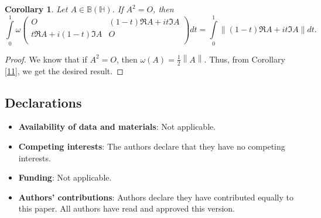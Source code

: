 \documentclass[12pt,twoside,reqno]{amsart}
\newtheorem{corollary}{Corollary}[section]
\numberwithin{equation}{section}
\begin{document}
\begin{corollary}
Let $A\in \mathbb B\left( \mathbb H \right)$. If ${{A}^{2}}=O$, then
\[\int\limits_{0}^{1}{\omega \left( \begin{matrix}
   O & \left( 1-t \right)\Re A+it\Im A  \\
   t\Re A+i\left( 1-t \right)\Im A & O  \\
\end{matrix} \right)dt}=\int\limits_{0}^{1}{\left\| \left( 1-t \right)\Re A+it\Im A \right\|dt}.\]
\end{corollary}
\begin{proof}
We know that if ${{A}^{2}}=O$, then $\omega \left( A \right)=\frac{1}{2}\left\| A \right\|$. Thus, from Corollary \ref{11}, we get the desired result.
\end{proof}







\subsection*{Declarations}

\begin{itemize}
\item \textbf{Availability of data and materials}: Not applicable.

\item \textbf{Competing interests}: The authors declare that they have no
competing interests.

\item \textbf{Funding}: Not applicable.

\item \textbf{Authors' contributions}: Authors declare they have contributed
equally to this paper. All authors have read and approved this version.
\end{itemize}
\end{document}
